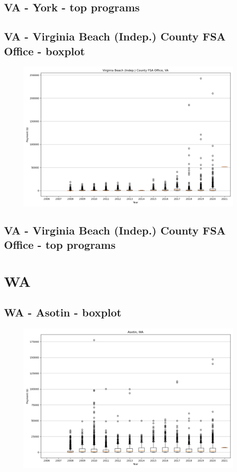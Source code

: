 \subsection*{VA - York - top programs}

\newpage
\subsection*{VA - Virginia Beach (Indep.) County FSA Office - boxplot}
\begin{figure}[h]
\centering
\includegraphics[width=7in]{../output/boxplots/counties/Virginia Beach (Indep.) County FSA Office-VA_boxplot.png}
\end{figure}


\subsection*{VA - Virginia Beach (Indep.) County FSA Office - top programs}

\newpage
\section*{WA}
\subsection*{WA - Asotin - boxplot}
\begin{figure}[h]
\centering
\includegraphics[width=7in]{../output/boxplots/counties/Asotin-WA_boxplot.png}
\end{figure}


